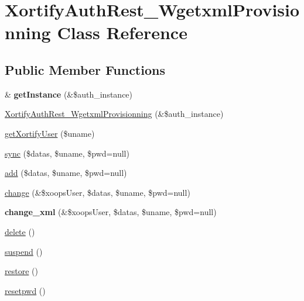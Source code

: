 \hypertarget{class_xortify_auth_rest___wgetxml_provisionning}{\section{Xortify\-Auth\-Rest\-\_\-\-Wgetxml\-Provisionning Class Reference}
\label{class_xortify_auth_rest___wgetxml_provisionning}
}
\subsection*{Public Member Functions}
\begin{DoxyCompactItemize}
\item 
\hypertarget{class_xortify_auth_rest___wgetxml_provisionning_a9a960616f3ce08552cb39d7eebe1aea5}{\& {\bfseries get\-Instance} (\&\$auth\-\_\-instance)}\label{class_xortify_auth_rest___wgetxml_provisionning_a9a960616f3ce08552cb39d7eebe1aea5}

\item 
\hyperlink{class_xortify_auth_rest___wgetxml_provisionning_aba3ada73fc974707d95af862968c95ce}{Xortify\-Auth\-Rest\-\_\-\-Wgetxml\-Provisionning} (\&\$auth\-\_\-instance)
\item 
\hyperlink{class_xortify_auth_rest___wgetxml_provisionning_aef775fcbdb9b655c26cf1013cd828512}{get\-Xortify\-User} (\$uname)
\item 
\hyperlink{class_xortify_auth_rest___wgetxml_provisionning_a4605fedfccbba8d8cd9ac7ef8fd00003}{sync} (\$datas, \$uname, \$pwd=null)
\item 
\hyperlink{class_xortify_auth_rest___wgetxml_provisionning_af696bb7fb2e8bc3a7da9eb0c8d772dfb}{add} (\$datas, \$uname, \$pwd=null)
\item 
\hyperlink{class_xortify_auth_rest___wgetxml_provisionning_ab845baccc3724e5f292363676ec710e5}{change} (\&\$xoops\-User, \$datas, \$uname, \$pwd=null)
\item 
\hypertarget{class_xortify_auth_rest___wgetxml_provisionning_a7edb63688d3e792fcdc1da0f42930ebe}{{\bfseries change\-\_\-xml} (\&\$xoops\-User, \$datas, \$uname, \$pwd=null)}\label{class_xortify_auth_rest___wgetxml_provisionning_a7edb63688d3e792fcdc1da0f42930ebe}

\item 
\hyperlink{class_xortify_auth_rest___wgetxml_provisionning_afa6fc43ea2c3007004bf377a335b86c6}{delete} ()
\item 
\hyperlink{class_xortify_auth_rest___wgetxml_provisionning_a201176a6a5e7710360dd0f980ec8c877}{suspend} ()
\item 
\hyperlink{class_xortify_auth_rest___wgetxml_provisionning_a7dbd0b14dedfede7c6ee3193a58cb01c}{restore} ()
\item 
\hyperlink{class_xortify_auth_rest___wgetxml_provisionning_a1b96de3480dc5c9a68acaf1b151d7737}{resetpwd} ()
\end{DoxyCompactItemize}
